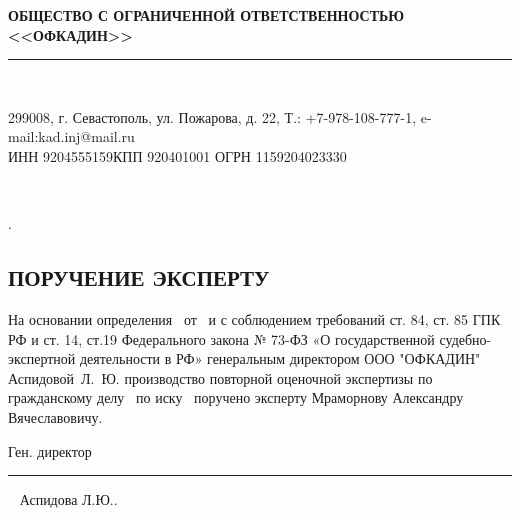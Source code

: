 \setcounter{page}{1}
\pagestyle{empty} %
%
\begin{center}
	{\large \textbf{ОБЩЕСТВО С ОГРАНИЧЕННОЙ ОТВЕТСТВЕННОСТЬЮ \\[-1.1mm] <<ОФКАДИН>>} \\[-4.5mm]}
	\noindent\rule{\textwidth}{1pt}\\[-6mm]  %
\end{center}	

\begin{center}
	\begin{footnotesize}
		\vspace{-3mm}299008, г. Севастополь, ул. Пожарова, д. 22, %
		Т.: \quad +7-978-108-777-1, e-mail:\quad kad.inj@mail.ru\\ [-2mm]{ИНН 9204555159\quad КПП 920401001 ОГРН 1159204023330 }
	\end{footnotesize}	\\[5mm]
\end{center}
%
.
\vspace{25mm}


\begin{center}
	\section{{\Large \textbf{ПОРУЧЕНИЕ ЭКСПЕРТУ}}}
\end{center}


На основании определения   \sud \,  от \dataopr  \, и с соблюдением требований ст. 84, ст. 85 ГПК РФ и ст. 14, ст.19 Федерального закона № 73-ФЗ «О государственной судебно-экспертной деятельности в РФ» генеральным директором ООО "ОФКАДИН" Аспидовой~Л.~Ю. производство повторной оценочной экспертизы по гражданскому делу  \delonum \, по иску \isk \,  поручено эксперту     Мраморнову Александру Вячеславовичу.





\vspace{35mm}

{Ген. директор}\hfill   \rule{4cm}{0.1 mm} \,\,\,  Аспидова Л.Ю..     